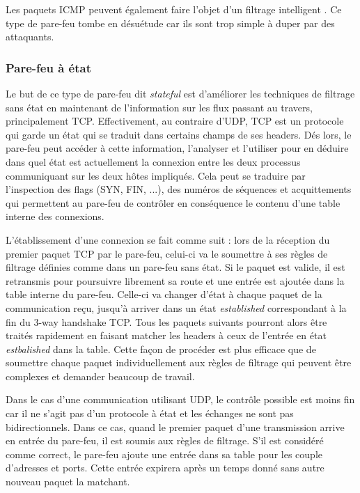 \documentclass[]{article}
\begin{document}
Les paquets ICMP peuvent également faire l'objet d'un filtrage intelligent \cite{Shimonski2013}.
Ce type de pare-feu tombe en désuétude car ils sont trop simple à duper par des attaquants.  

\subsubsection{Pare-feu à état}

Le but de ce type de pare-feu dit \textit{stateful} est d'améliorer les techniques de filtrage sans état en maintenant de l'information sur les flux passant au travers, principalement TCP. Effectivement, au contraire d'UDP, TCP est un protocole qui garde un état qui se traduit dans certains champs de ses headers. Dés lors, le pare-feu peut accéder à cette information, l'analyser et l'utiliser pour en déduire dans quel état est actuellement la connexion entre les deux processus communiquant sur les deux hôtes impliqués. Cela peut se traduire par l'inspection des flags (SYN, FIN, ...), des numéros de séquences et acquittements qui permettent au pare-feu de contrôler en conséquence le contenu d'une table interne des connexions.\\ 

\par L'établissement d'une connexion se fait comme suit : lors de la réception du premier paquet TCP par le pare-feu, celui-ci va le soumettre à ses règles de filtrage définies comme dans un pare-feu sans état. Si le paquet est valide, il est retransmis pour poursuivre librement sa route et une entrée est ajoutée dans la table interne du pare-feu. Celle-ci va changer d'état à chaque paquet de la communication reçu, jusqu'à arriver dans un état \textit{established} correspondant à la fin du 3-way handshake TCP. Tous les paquets suivants pourront alors être traités rapidement en faisant matcher les headers à ceux de l'entrée en état \textit{estbalished} dans la table. Cette façon de procéder est plus efficace que de soumettre chaque paquet individuellement aux règles de filtrage qui peuvent être complexes et demander beaucoup de travail.\\

\par Dans le cas d'une communication utilisant UDP, le contrôle possible est moins fin car il ne s'agit pas d'un protocole à état et les échanges ne sont pas bidirectionnels. Dans ce cas, quand le premier paquet d'une transmission arrive en entrée du pare-feu, il est soumis aux règles de filtrage. S'il est considéré comme correct, le pare-feu ajoute une entrée dans sa table pour les couple d'adresses et ports. Cette entrée expirera après un temps donné sans autre nouveau paquet la matchant. 
\end{document}
